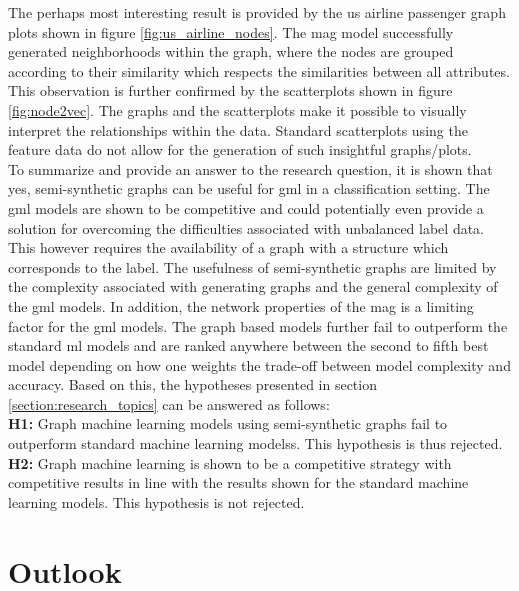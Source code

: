   \noindent The perhaps most interesting result is provided by the \acs{us} 
  airline passenger graph plots shown in figure \ref{fig:us_airline_nodes}. The 
  \acs{mag} model successfully generated neighborhoods within the graph, where 
  the nodes are grouped according to their similarity which respects the 
  similarities between all attributes. This observation is further confirmed 
  by the scatterplots shown in figure \ref{fig:node2vec}. The graphs and the 
  scatterplots make it possible to visually interpret the relationships within 
  the data. Standard scatterplots using the feature data do not allow for the 
  generation of such insightful graphs/plots. \\

  \noindent To summarize and provide an answer to the research question, it is
  shown that yes, semi-synthetic graphs can be useful for \acs{gml} in a
  classification setting. The \acs{gml} models are shown to be competitive and 
  could potentially even provide a solution for overcoming the difficulties 
  associated with unbalanced label data. This however requires the availability 
  of a graph with a structure which corresponds to the label. The usefulness of 
  semi-synthetic graphs are limited by the complexity associated with generating 
  graphs and the general complexity of the \acs{gml} models. In addition, the
  network properties of the \acs{mag} is a limiting factor for the \acs{gml}
  models. The graph based models further fail to outperform the standard 
  \acs{ml} models and are ranked anywhere between the second to fifth best model 
  depending on how one weights the trade-off between model complexity and accuracy. 
  Based on this, the hypotheses presented in section 
  \ref{section:research_topics} can be answered as follows: \\

  \noindent\textbf{H1:} Graph machine learning models using semi-synthetic graphs 
  fail to outperform standard machine learning modelss. This hypothesis is thus
  rejected. \\

  \noindent\textbf{H2:} Graph machine learning is shown to be a competitive
  strategy with competitive results in line with the results shown for the
  standard machine learning models. This hypothesis is not rejected.

  \section{Outlook}

